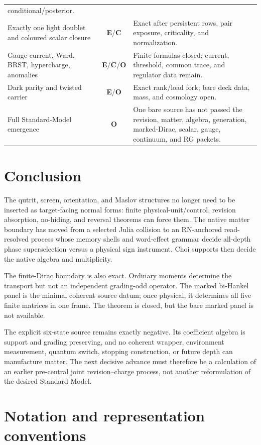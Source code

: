 \documentclass[11pt,oneside,openany]{book}
\numberwithin{equation}{chapter}
\theoremstyle{definition}
\theoremstyle{remark}
\newcommand{\statusE}{\textcolor{ExactColor}{\textbf{E}}}
\newcommand{\statusC}{\textcolor{CondColor}{\textbf{C}}}
\newcommand{\statusO}{\textcolor{OpenColor}{\textbf{O}}}
\begin{document}
\begin{longtable}{@{}p{}cp{}@{}}
conditional/posterior.\\
\addlinespace
Exactly one light doublet and coloured scalar closure
& \statusE/\statusC
& Exact after persistent rows, pair exposure, criticality, and normalization.\\
\addlinespace
Gauge-current, Ward, BRST, hypercharge, anomalies
& \statusE/\statusC/\statusO
& Finite formulas closed; current, threshold, common trace, and regulator data
remain.\\
\addlinespace
Dark parity and twisted carrier
& \statusE/\statusO
& Exact rank/load fork; bare deck data, mass, and cosmology open.\\
\addlinespace
Full Standard-Model emergence
& \statusO
& One bare source has not passed the revision, matter, algebra, generation,
marked-Dirac, scalar, gauge, continuum, and RG packets.\\
\bottomrule
\end{longtable}

\chapter{Conclusion}
\label{ch:conclusion}
The qutrit, screen, orientation, and Maslov structures no longer need to be
inserted as target-facing normal forms: finite physical-unit/control, revision
absorption, no-hiding, and reversal theorems can force them.  The native matter
boundary has moved from a selected Julia collision to an RN-anchored
read-resolved process whose memory shells and word-effect grammar decide
all-depth phase superselection versus a physical sign instrument.  Choi
supports then decide the native algebra and multiplicity.

The finite-Dirac boundary is also exact.  Ordinary moments determine the
transport but not an independent grading-odd operator.  The marked bi-Hankel
panel is the minimal coherent source datum; once physical, it determines all
five finite matrices in one frame.  The theorem is closed, but the bare marked
panel is not available.

The explicit six-state source remains exactly negative.  Its coefficient
algebra is support and grading preserving, and no coherent wrapper,
environment measurement, quantum switch, stopping construction, or future
depth can manufacture matter.  The next decisive advance must therefore be a
calculation of an earlier pre-central joint revision--charge process, not
another reformulation of the desired Standard Model.

\chapter{Notation and representation conventions}
\label{app:notation}
\end{document}
